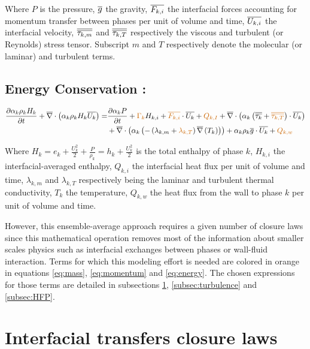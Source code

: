 Where $P$ is the pressure, $\overline{g}$ the gravity, $\overline{F_{k,i}}$ the interfacial forces accounting for momentum transfer between phases per unit of volume and time, $\overline{U_{k,i}}$ the interfacial velocity, $\overline{\overline{\tau_{k,m}}}$ and $\overline{\overline{\tau_{k,T}}}$ respectively the viscous and turbulent (or Reynolds) stress tensor. Subscript $m$ and $T$ respectively denote the molecular (or laminar) and turbulent terms.

\subsection{Energy Conservation :}

\begin{equation}
	\label{eq:energy}
\begin{aligned}
	\dtime{\alpha_{k}\rho_{k} H_{k}} + \divg{\alpha_{k}\rho_{k} H_{k}\vect{U_{k}}} =& \dtime{\alpha_{k}P} + \orangemath{\Gamma_{k}}H_{k,i}+\orangemath{\vect{F_{k,i}}}\cdot \vect{U_{k}} + \orangemath{Q_{k,I}} + \divg{\alpha_{k}\parth{ \tens{\tau_{k}} + \orangemath{\tens{\tau_{k,T}}} }\cdot \vect{U_{k}}}\\
	& + \divg{\alpha_{k} \parth{-\parth{ \lambda_{k,m}+\orangemath{\lambda_{k,T}}}\grad{T_{k}}}} + \alpha_{k}\rho_{k}\vect{g}\cdot \vect{U_{k}} + \orangemath{Q_{k,w}}
\end{aligned}
\end{equation}

Where $H_{k}=e_{k}+\frac{U_{k}^{2}}{2}+\frac{P}{\rho_{k}}=h_{k}+\frac{U_{k}^{2}}{2}$ is the total enthalpy of phase $k$, $H_{k,i}$ the interfacial-averaged enthalpy, $Q_{k,i}$ the interfacial heat flux per unit of volume and time, $\lambda_{k,m}$ and $\lambda_{k,T}$ respectively being the laminar and turbulent thermal conductivity, $T_{k}$ the temperature, $Q_{k,w}$ the heat flux from the wall to phase $k$ per unit of volume and time.

\npar

However, this ensemble-average approach requires a given number of closure laws since this mathematical operation removes most of the information about smaller scales physics such as interfacial exchanges between phases or wall-fluid interaction. Terms for which this modeling effort is needed are colored in orange in equations \ref{eq:mass}, \ref{eq:momentum} and \ref{eq:energy}. The chosen expressions for those terms are detailed in subsections \ref{subsec:int_transfers}, \ref{subsec:turbulence} and \ref{subsec:HFP}.

\section{Interfacial transfers closure laws}
\label{subsec:int_transfers}


